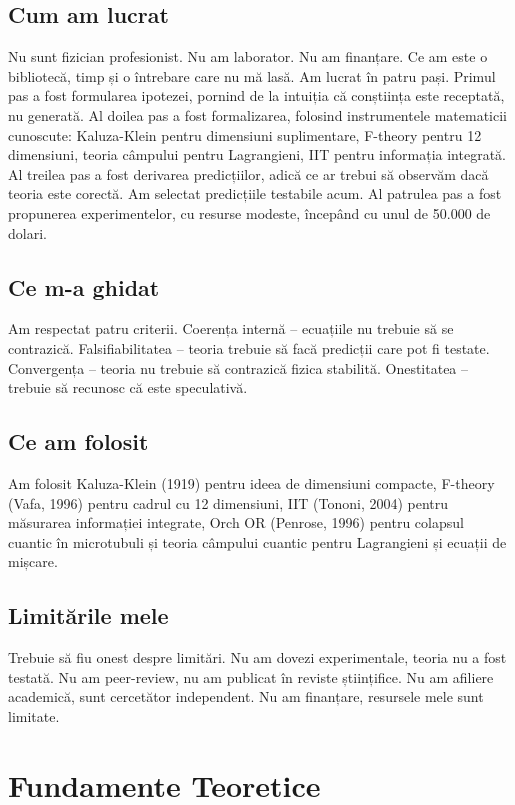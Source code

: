 \documentclass[11pt,a4paper]{article}
\begin{document}
\subsection{Cum am lucrat}
Nu sunt fizician profesionist. Nu am laborator. Nu am finanțare. Ce am este o bibliotecă, timp și o întrebare care nu mă lasă. Am lucrat în patru pași. Primul pas a fost formularea ipotezei, pornind de la intuiția că conștiința este receptată, nu generată. Al doilea pas a fost formalizarea, folosind instrumentele matematicii cunoscute: Kaluza-Klein pentru dimensiuni suplimentare, F-theory pentru 12 dimensiuni, teoria câmpului pentru Lagrangieni, IIT pentru informația integrată. Al treilea pas a fost derivarea predicțiilor, adică ce ar trebui să observăm dacă teoria este corectă. Am selectat predicțiile testabile acum. Al patrulea pas a fost propunerea experimentelor, cu resurse modeste, începând cu unul de 50.000 de dolari.

\subsection{Ce m-a ghidat}
Am respectat patru criterii. Coerența internă – ecuațiile nu trebuie să se contrazică. Falsifiabilitatea – teoria trebuie să facă predicții care pot fi testate. Convergența – teoria nu trebuie să contrazică fizica stabilită. Onestitatea – trebuie să recunosc că este speculativă.

\subsection{Ce am folosit}
Am folosit Kaluza-Klein (1919) pentru ideea de dimensiuni compacte, F-theory (Vafa, 1996) pentru cadrul cu 12 dimensiuni, IIT (Tononi, 2004) pentru măsurarea informației integrate, Orch OR (Penrose, 1996) pentru colapsul cuantic în microtubuli și teoria câmpului cuantic pentru Lagrangieni și ecuații de mișcare.

\subsection{Limitările mele}
Trebuie să fiu onest despre limitări. Nu am dovezi experimentale, teoria nu a fost testată. Nu am peer-review, nu am publicat în reviste științifice. Nu am afiliere academică, sunt cercetător independent. Nu am finanțare, resursele mele sunt limitate.

\section{Fundamente Teoretice}
\end{document}
